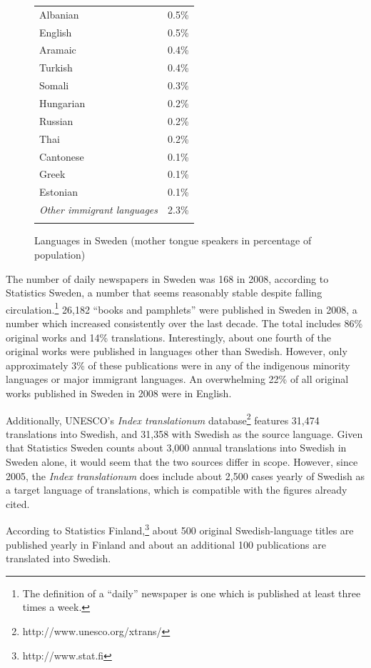 \begin{multicols}{2}
\begin{figure}[!h]
\begin{tabular}{lc}
Albanian & 0.5\% \\  \addlinespace
English & 0.5\% \\  \addlinespace
Aramaic & 0.4\% \\  \addlinespace
Turkish & 0.4\% \\  \addlinespace
Somali & 0.3\% \\  \addlinespace
Hungarian & 0.2\% \\  \addlinespace
Russian & 0.2\% \\  \addlinespace
Thai & 0.2\% \\  \addlinespace
Cantonese & 0.1\% \\  \addlinespace
Greek & 0.1\% \\  \addlinespace
Estonian & 0.1\% \\  \addlinespace
\textit{Other immigrant languages} & 2.3\% \\  \addlinespace
\end{tabular}
\caption{Languages in Sweden (mother tongue speakers in percentage of population)}
\label{fig:swedish_langs_en}
\end{figure}

The number of daily newspapers in Sweden was 168 in 2008, according to
Statistics Sweden, a number that seems reasonably stable despite
falling circulation.\footnote{The definition of a ``daily'' newspaper is
  one which is published at least three times a week.} 26,182 ``books
and pamphlets'' were published in Sweden in 2008, a number which
increased consistently over the last decade. The total includes 86\%
original works and 14\% translations. Interestingly, about one fourth
of the original works were published in languages other than
Swedish. However, only approximately 3\% of these publications were
in any of the indigenous minority languages or major immigrant
languages. An overwhelming 22\% of all original works published in
Sweden in 2008 were in English.

Additionally, UNESCO’s \textit{Index translationum}
data\-base\footnote{http://www.unesco.org/xtrans/} features 31,474
translations into Swedish, and 31,358 with Swedish as the source
language. Given that Statistics Sweden counts about 3,000 annual
translations into Swedish in Sweden alone, it would seem that the two
sources differ in scope. However, since 2005, the \textit{Index
  translationum} does include about 2,500 cases yearly of Swedish as a
target language of translations, which is compatible with the figures
already cited.

According to Statistics Finland,\footnote{http://www.stat.fi} about
500 original Swedish-language titles are published yearly in Finland
and about an additional 100 publications are translated into Swedish.


\end{multicols}
